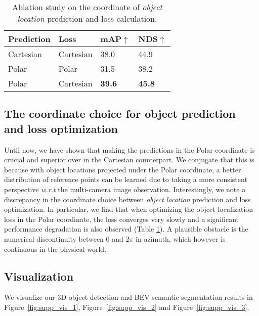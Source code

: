 \documentclass[letterpaper]{article} \usepackage{aaai23}  \usepackage{times}  \usepackage{helvet}  \usepackage{courier}  \usepackage[hyphens]{url}  \usepackage{graphicx} \urlstyle{rm} \def\UrlFont{\rm}  \usepackage{natbib}  \usepackage{caption} \frenchspacing  \setlength{\pdfpagewidth}{8.5in} \setlength{\pdfpageheight}{11in} \usepackage{algorithm}
\def\wrt{\textit{w.r.t}}
\begin{document}
\begin{table}[]
    \footnotesize
    \caption{
    Ablation study on the coordinate of 
    {\em object location} prediction and loss calculation.
    }
    \label{tab:coord_target_loss}
    \centering
    \setlength{\tabcolsep}{12pt}
    \renewcommand{\arraystretch}{1.1}{
    \begin{tabular}{ll||ll}
    \hline
    
    \hline
    \cellcolor{white}\textbf{Prediction} & \textbf{Loss} & \textbf{mAP}$\uparrow$ & \textbf{NDS}$\uparrow$ \\
    \hline
    Cartesian & Cartesian & 38.0 & 44.9  \\
    Polar & Polar & 31.5 & 38.2 \\
    \rowcolor[gray]{.9} 
    Polar & Cartesian &  \textbf{39.6} & \textbf{45.8} \\
    \hline
    
    \hline
    \end{tabular}
    }
\end{table}
 
\subsection{The coordinate choice for object prediction and loss optimization}

Until now, we have shown that making the predictions in the Polar coordinate is crucial and superior over in the Cartesian counterpart.
We conjugate that 
this is because with object locations projected under the Polar coordinate, a better distribution of reference points can be learned due to taking a more consistent perspective \wrt{} the multi-camera image observation.
Interestingly, we note a discrepancy in the coordinate choice 
between {\em object location} prediction and loss optimization.
In particular, we find that when optimizing the object localization loss in the Polar coordinate, the loss converges very slowly and a significant performance degradation is also observed (Table \ref{tab:coord_target_loss}). 
A plausible obstacle is the numerical discontinuity between 0 and $2\pi$ in azimuth, which however is continuous in the physical world. 

\subsection{Visualization}
We visualize our 3D object detection and BEV semantic segmentation results in Figure~\ref{fig:supp_vis_1}, Figure~\ref{fig:supp_vis_2} and Figure~\ref{fig:supp_vis_3}.
\end{document}
